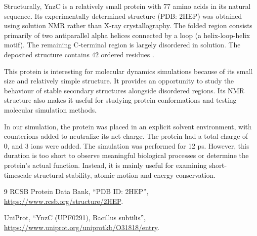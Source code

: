 \documentclass[11pt, a4paper]{article}
\begin{document}
Structurally, YnzC is a relatively small protein with 77 amino acids
in its natural sequence. Its experimentally determined structure
(PDB: 2HEP) was obtained using solution NMR rather than X-ray
crystallography. The folded region consists primarily of two
antiparallel alpha helices connected by a loop (a helix-loop-helix
motif). The remaining C-terminal region is largely disordered in
solution. The deposited structure contains 42 ordered residues
\cite{rcsb_2hep,uniprot_ynzc}.

This protein is interesting for molecular dynamics simulations
because of its small size and relatively simple structure. It provides
an opportunity to study the behaviour of stable secondary structures
alongside disordered regions. Its NMR structure also makes it useful
for studying protein conformations and testing molecular simulation
methods.

In our simulation, the protein was placed in an explicit solvent
environment, with counterions added to neutralize its net charge.
The protein had a total charge of 0, and 3 ions were added. The simulation was performed
for 12 ps. However, this duration is too short to observe meaningful
biological processes or determine the protein's actual function.
Instead, it is mainly useful for examining short-timescale structural
stability, atomic motion and energy conservation.

\begin{thebibliography}{9}
RCSB Protein Data Bank, ``PDB ID: 2HEP'',
\url{https://www.rcsb.org/structure/2HEP}.

UniProt, ``YnzC (UPF0291), Bacillus subtilis'',
\url{https://www.uniprot.org/uniprotkb/O31818/entry}.
\end{thebibliography}
\end{document}
